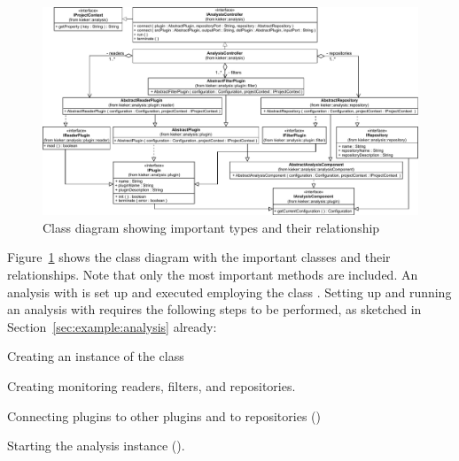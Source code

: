 
\begin{figure}\centering
\includegraphics[width=\textwidth]{images/kieker_AnalysisControlleruserguide-modified}
\caption{Class diagram showing important \KiekerAnalysisPart{} types and their relationship}
\label{fig:analysisController:classdiagram}
\end{figure}


\noindent Figure~\ref{fig:analysisController:classdiagram} shows the class diagram %
with the important \KiekerAnalysisPart{} classes and their relationships. %
Note that only the most important methods are included. 
An analysis with \KiekerAnalysisPart{} is set up and executed employing %
the class . %
Setting up and running an analysis with \KiekerAnalysisPart{} requires the %
following steps to be performed, as sketched in Section~\ref{sec:example:analysis} already:

\enlargethispage{1.2cm}

\medskip

\begin{compactenum}
\item Creating an instance of the  class
\item Creating monitoring readers, filters, and repositories.
\item Connecting plugins to other plugins and to repositories ()
\item Starting the analysis instance ().
\end{compactenum}

